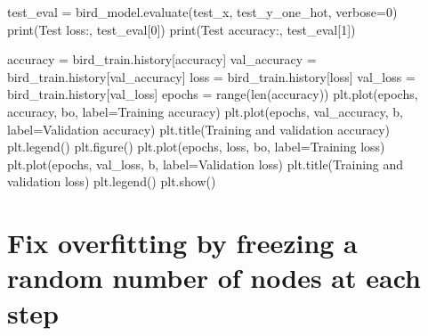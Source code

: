 \documentclass[
  letterpaper,
  DIV=11,
  numbers=noendperiod]{scrartcl}
\newenvironment{Shaded}{\begin{snugshade}}{\end{snugshade}}
\newcommand{\BuiltInTok}[1]{\textcolor[rgb]{0.00,0.23,0.31}{#1}}
\newcommand{\DecValTok}[1]{\textcolor[rgb]{0.68,0.00,0.00}{#1}}
\newcommand{\NormalTok}[1]{\textcolor[rgb]{0.00,0.23,0.31}{#1}}
\newcommand{\OperatorTok}[1]{\textcolor[rgb]{0.37,0.37,0.37}{#1}}
\newcommand{\StringTok}[1]{\textcolor[rgb]{0.13,0.47,0.30}{#1}}
\begin{document}
\begin{Shaded}
\begin{Highlighting}[]
\NormalTok{test\_eval }\OperatorTok{=}\NormalTok{ bird\_model.evaluate(test\_x, test\_y\_one\_hot, verbose}\OperatorTok{=}\DecValTok{0}\NormalTok{)}
\BuiltInTok{print}\NormalTok{(}\StringTok{\textquotesingle{}Test loss:\textquotesingle{}}\NormalTok{, test\_eval[}\DecValTok{0}\NormalTok{])}
\BuiltInTok{print}\NormalTok{(}\StringTok{\textquotesingle{}Test accuracy:\textquotesingle{}}\NormalTok{, test\_eval[}\DecValTok{1}\NormalTok{])}

\NormalTok{accuracy }\OperatorTok{=}\NormalTok{ bird\_train.history[}\StringTok{\textquotesingle{}accuracy\textquotesingle{}}\NormalTok{]}
\NormalTok{val\_accuracy }\OperatorTok{=}\NormalTok{ bird\_train.history[}\StringTok{\textquotesingle{}val\_accuracy\textquotesingle{}}\NormalTok{]}
\NormalTok{loss }\OperatorTok{=}\NormalTok{ bird\_train.history[}\StringTok{\textquotesingle{}loss\textquotesingle{}}\NormalTok{]}
\NormalTok{val\_loss }\OperatorTok{=}\NormalTok{ bird\_train.history[}\StringTok{\textquotesingle{}val\_loss\textquotesingle{}}\NormalTok{]}
\NormalTok{epochs }\OperatorTok{=} \BuiltInTok{range}\NormalTok{(}\BuiltInTok{len}\NormalTok{(accuracy))}
\NormalTok{plt.plot(epochs, accuracy, }\StringTok{\textquotesingle{}bo\textquotesingle{}}\NormalTok{, label}\OperatorTok{=}\StringTok{\textquotesingle{}Training accuracy\textquotesingle{}}\NormalTok{)}
\NormalTok{plt.plot(epochs, val\_accuracy, }\StringTok{\textquotesingle{}b\textquotesingle{}}\NormalTok{, label}\OperatorTok{=}\StringTok{\textquotesingle{}Validation accuracy\textquotesingle{}}\NormalTok{)}
\NormalTok{plt.title(}\StringTok{\textquotesingle{}Training and validation accuracy\textquotesingle{}}\NormalTok{)}
\NormalTok{plt.legend()}
\NormalTok{plt.figure()}
\NormalTok{plt.plot(epochs, loss, }\StringTok{\textquotesingle{}bo\textquotesingle{}}\NormalTok{, label}\OperatorTok{=}\StringTok{\textquotesingle{}Training loss\textquotesingle{}}\NormalTok{)}
\NormalTok{plt.plot(epochs, val\_loss, }\StringTok{\textquotesingle{}b\textquotesingle{}}\NormalTok{, label}\OperatorTok{=}\StringTok{\textquotesingle{}Validation loss\textquotesingle{}}\NormalTok{)}
\NormalTok{plt.title(}\StringTok{\textquotesingle{}Training and validation loss\textquotesingle{}}\NormalTok{)}
\NormalTok{plt.legend()}
\NormalTok{plt.show()}
\end{Highlighting}
\end{Shaded}

\section{Fix overfitting by freezing a random number of nodes at each
step}\label{fix-overfitting-by-freezing-a-random-number-of-nodes-at-each-step}
\end{document}

